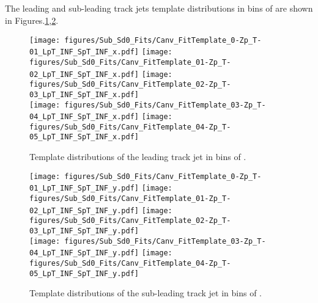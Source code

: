 \clearpage
\subsection{\zpt}

The leading and sub-leading track jets template \subsdzero distributions in bins of \zpt are shown in Figures.\ref{fig:ZpT-template-leading},\ref{fig:ZpT-template-subleading}.

\begin{figure}[htbp]
  \centering
 \texttt{[image: figures/Sub\_Sd0\_Fits/Canv\_FitTemplate\_0-Zp\_T-01\_LpT\_INF\_SpT\_INF\_x.pdf]}
 \texttt{[image: figures/Sub\_Sd0\_Fits/Canv\_FitTemplate\_01-Zp\_T-02\_LpT\_INF\_SpT\_INF\_x.pdf]}
 \texttt{[image: figures/Sub\_Sd0\_Fits/Canv\_FitTemplate\_02-Zp\_T-03\_LpT\_INF\_SpT\_INF\_x.pdf]}\\
 \texttt{[image: figures/Sub\_Sd0\_Fits/Canv\_FitTemplate\_03-Zp\_T-04\_LpT\_INF\_SpT\_INF\_x.pdf]}
 \texttt{[image: figures/Sub\_Sd0\_Fits/Canv\_FitTemplate\_04-Zp\_T-05\_LpT\_INF\_SpT\_INF\_x.pdf]}

\caption{Template \subsdzero distributions of the leading track jet in bins of \zpt. }
  \label{fig:ZpT-template-leading}
\end{figure}


\begin{figure}[htbp]
  \centering
 \texttt{[image: figures/Sub\_Sd0\_Fits/Canv\_FitTemplate\_0-Zp\_T-01\_LpT\_INF\_SpT\_INF\_y.pdf]}
 \texttt{[image: figures/Sub\_Sd0\_Fits/Canv\_FitTemplate\_01-Zp\_T-02\_LpT\_INF\_SpT\_INF\_y.pdf]}
 \texttt{[image: figures/Sub\_Sd0\_Fits/Canv\_FitTemplate\_02-Zp\_T-03\_LpT\_INF\_SpT\_INF\_y.pdf]}\\
 \texttt{[image: figures/Sub\_Sd0\_Fits/Canv\_FitTemplate\_03-Zp\_T-04\_LpT\_INF\_SpT\_INF\_y.pdf]}
 \texttt{[image: figures/Sub\_Sd0\_Fits/Canv\_FitTemplate\_04-Zp\_T-05\_LpT\_INF\_SpT\_INF\_y.pdf]}

\caption{Template \subsdzero distributions of the sub-leading track jet in bins of \zpt. }
  \label{fig:ZpT-template-subleading}
\end{figure}



